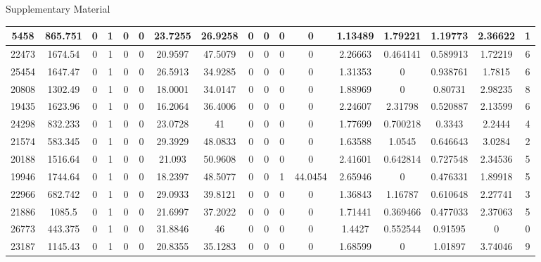 \begin{wcfChaps}{Supplementary Material}
\begin{sidewaystable}
{\begin{tabular}{|c|c|c|c|c|c|c|c|c|c|c|c|c|c|c|c|c|}
5458 & 865.751 & 0 & 1 & 0 & 0 & 23.7255 & 26.9258 & 0 & 0 & 0 & 0 & 1.13489 & 1.79221 & 1.19773 & 2.36622 & 1 \\\hline
22473 & 1674.54 & 0 & 1 & 0 & 0 & 20.9597 & 47.5079 & 0 & 0 & 0 & 0 & 2.26663 & 0.464141 & 0.589913 & 1.72219 & 6 \\\hline
25454 & 1647.47 & 0 & 1 & 0 & 0 & 26.5913 & 34.9285 & 0 & 0 & 0 & 0 & 1.31353 & 0 & 0.938761 & 1.7815 & 6 \\\hline
20808 & 1302.49 & 0 & 1 & 0 & 0 & 18.0001 & 34.0147 & 0 & 0 & 0 & 0 & 1.88969 & 0 & 0.80731 & 2.98235 & 8 \\\hline
19435 & 1623.96 & 0 & 1 & 0 & 0 & 16.2064 & 36.4006 & 0 & 0 & 0 & 0 & 2.24607 & 2.31798 & 0.520887 & 2.13599 & 6 \\\hline
24298 & 832.233 & 0 & 1 & 0 & 0 & 23.0728 & 41 & 0 & 0 & 0 & 0 & 1.77699 & 0.700218 & 0.3343 & 2.2444 & 4 \\\hline
21574 & 583.345 & 0 & 1 & 0 & 0 & 29.3929 & 48.0833 & 0 & 0 & 0 & 0 & 1.63588 & 1.0545 & 0.646643 & 3.0284 & 2 \\\hline
20188 & 1516.64 & 0 & 1 & 0 & 0 & 21.093 & 50.9608 & 0 & 0 & 0 & 0 & 2.41601 & 0.642814 & 0.727548 & 2.34536 & 5 \\\hline
19946 & 1744.64 & 0 & 1 & 0 & 0 & 18.2397 & 48.5077 & 0 & 0 & 1 & 44.0454 & 2.65946 & 0 & 0.476331 & 1.89918 & 5 \\\hline
22966 & 682.742 & 0 & 1 & 0 & 0 & 29.0933 & 39.8121 & 0 & 0 & 0 & 0 & 1.36843 & 1.16787 & 0.610648 & 2.27741 & 3 \\\hline
21886 & 1085.5 & 0 & 1 & 0 & 0 & 21.6997 & 37.2022 & 0 & 0 & 0 & 0 & 1.71441 & 0.369466 & 0.477033 & 2.37063 & 5 \\\hline
26773 & 443.375 & 0 & 1 & 0 & 0 & 31.8846 & 46 & 0 & 0 & 0 & 0 & 1.4427 & 0.552544 & 0.91595 & 0 & 0 \\\hline
23187 & 1145.43 & 0 & 1 & 0 & 0 & 20.8355 & 35.1283 & 0 & 0 & 0 & 0 & 1.68599 & 0 & 1.01897 & 3.74046 & 9 \\\hline


\end{tabular}}
\end{sidewaystable}
\end{wcfChaps}
